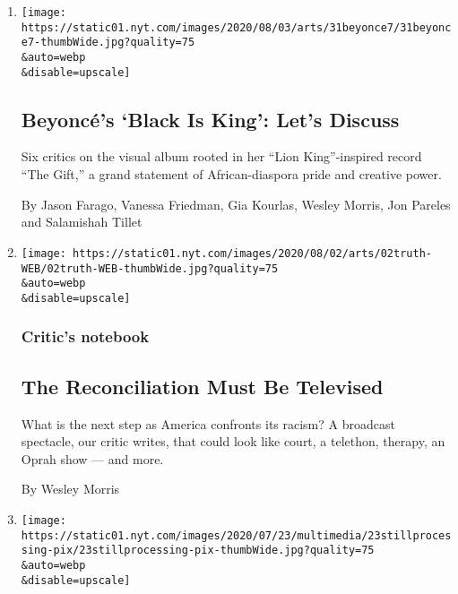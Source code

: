 \begin{enumerate}
\def\labelenumi{\arabic{enumi}.}
\item
  \href{/2020/07/31/arts/music/beyonce-black-is-king.html}{}

  \texttt{[image: https://static01.nyt.com/images/2020/08/03/arts/31beyonce7/31beyonce7-thumbWide.jpg?quality=75\\\&auto=webp\\\&disable=upscale]}

  \hypertarget{beyoncuxe9s-black-is-king-lets-discuss}{%
  \subsection{Beyoncé's `Black Is King': Let's
  Discuss}\label{beyoncuxe9s-black-is-king-lets-discuss}}

  Six critics on the visual album rooted in her ``Lion King''-inspired
  record ``The Gift,'' a grand statement of African-diaspora pride and
  creative power.

  By Jason Farago, Vanessa Friedman, Gia Kourlas, Wesley Morris, Jon
  Pareles and Salamishah Tillet
\item
  \href{/2020/07/30/arts/television/the-moment-racism-tv.html}{}

  \texttt{[image: https://static01.nyt.com/images/2020/08/02/arts/02truth-WEB/02truth-WEB-thumbWide.jpg?quality=75\\\&auto=webp\\\&disable=upscale]}

  \hypertarget{critics-notebook}{%
  \subsubsection{Critic's notebook}\label{critics-notebook}}

  \hypertarget{the-reconciliation-must-be-televised}{%
  \subsection{The Reconciliation Must Be
  Televised}\label{the-reconciliation-must-be-televised}}

  What is the next step as America confronts its racism? A broadcast
  spectacle, our critic writes, that could look like court, a telethon,
  therapy, an Oprah show --- and more.

  By Wesley Morris
\item
  \href{/2020/07/23/podcasts/hamilton-ziwe-discomfort.html}{}

  \texttt{[image: https://static01.nyt.com/images/2020/07/23/multimedia/23stillprocessing-pix/23stillprocessing-pix-thumbWide.jpg?quality=75\\\&auto=webp\\\&disable=upscale]}


\end{enumerate}
